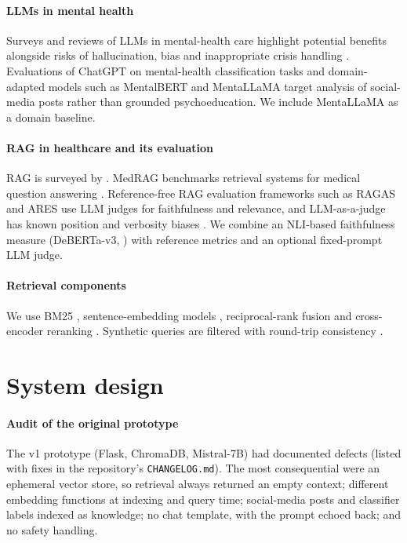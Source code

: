 \documentclass[preprint,12pt,authoryear]{elsarticle}
\begin{document}
\paragraph{LLMs in mental health} Surveys and reviews of LLMs in mental-health care highlight potential benefits
alongside risks of hallucination, bias and inappropriate crisis handling
\citep{hua2024llmmh,guo2024llmmhreview,dechoudhury2023benefits,stade2024behavioral}. Evaluations of ChatGPT on
mental-health classification tasks \citep{lamichhane2023chatgpt} and domain-adapted models such as MentalBERT
\citep{ji2022mentalbert} and MentaLLaMA \citep{yang2023mentallama} target analysis of social-media posts rather than
grounded psychoeducation. We include MentaLLaMA as a domain baseline.

\paragraph{RAG in healthcare and its evaluation} RAG \citep{lewis2020rag} is surveyed by \citet{gao2023ragsurvey}.
MedRAG benchmarks retrieval systems for medical question answering \citep{xiong2024medrag}. Reference-free RAG evaluation
frameworks such as RAGAS \citep{es2023ragas} and ARES \citep{saadfalcon2023ares} use LLM judges for faithfulness and
relevance, and LLM-as-a-judge has known position and verbosity biases \citep{zheng2023judge}. We combine an NLI-based
faithfulness measure (DeBERTa-v3, \citealp{he2021debertav3}) with reference metrics \citep{lin2004rouge,zhang2020bertscore}
and an optional fixed-prompt LLM judge.

\paragraph{Retrieval components} We use BM25 \citep{robertson2009bm25}, sentence-embedding models
\citep{reimers2019sbert,xiao2023cpack,wang2022e5,li2023gte}, reciprocal-rank fusion \citep{cormack2009rrf} and
cross-encoder reranking \citep{nogueira2019passage}. Synthetic queries are filtered with round-trip consistency
\citep{alberti2019synthetic}.

\section{System design}\label{sec:system}
\paragraph{Audit of the original prototype} The v1 prototype (Flask, ChromaDB, Mistral-7B) had
\NBugsAudited{} documented defects (listed with fixes in the repository's \texttt{CHANGELOG.md}). The most consequential
were an ephemeral vector store, so retrieval always returned an empty context; different embedding functions at
indexing and query time; social-media posts and classifier labels indexed as knowledge; no chat template, with the
prompt echoed back; and no safety handling.
\end{document}

